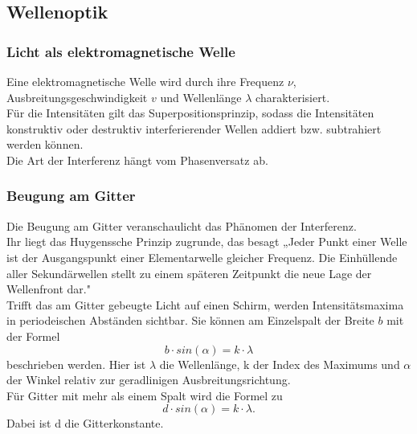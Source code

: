 \subsection{Wellenoptik}
\subsubsection*{Licht als elektromagnetische Welle}
Eine elektromagnetische Welle wird durch ihre Frequenz $\nu$, Ausbreitungsgeschwindigkeit $v$ und 
Wellenlänge $\lambda$ charakterisiert. \\
Für die Intensitäten gilt das Superpositionsprinzip, sodass die Intensitäten konstruktiv oder destruktiv interferierender Wellen addiert bzw. subtrahiert werden können.\\
Die Art der Interferenz hängt vom Phasenversatz ab.\\

\subsubsection*{Beugung am Gitter}
Die Beugung am Gitter veranschaulicht das Phänomen der Interferenz.\\ 
Ihr liegt das Huygenssche Prinzip zugrunde, das besagt „Jeder Punkt einer Welle ist der Ausgangspunkt einer Elementarwelle gleicher Frequenz. 
Die Einhüllende aller Sekundärwellen stellt zu einem späteren Zeitpunkt die neue Lage der Wellenfront dar." \cite{sample}\\
Trifft das am Gitter gebeugte Licht auf einen Schirm, werden Intensitätsmaxima in periodeischen Abständen sichtbar. 
Sie können am Einzelspalt der Breite $b$ mit der Formel
\begin{equation*}
    b \cdot sin(\alpha) = k \cdot \lambda
\end{equation*}
beschrieben werden. Hier ist $\lambda$ die Wellenlänge, k der Index des 
Maximums und $\alpha$ der Winkel relativ zur geradlinigen Ausbreitungsrichtung.\\
Für Gitter mit mehr als einem Spalt wird die Formel zu 
\begin{equation*}
    d \cdot sin(\alpha) = k \cdot \lambda.
\end{equation*}
Dabei ist d die Gitterkonstante.\\

